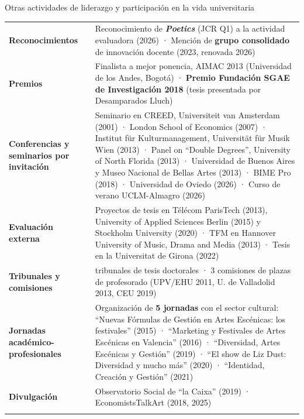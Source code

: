 \documentclass[
  8pt,
  ignorenonframetext,
  aspectratio=169,
  spanish,
]{beamer}
\newcommand{\lightrowrule}{\arrayrulecolor{black!25}\specialrule{0.4pt}{1pt}{1pt}\arrayrulecolor{black}}
\begin{document}
\begin{frame}[shrink]{Otras actividades de liderazgo y participación en
la vida universitaria}
\label{otras-actividades-de-liderazgo-y-participaciuxf3n-en-la-vida-universitaria}
~

\begin{longtable}[]{@{}
  >{\raggedright\arraybackslash}p{}
  >{\raggedright\arraybackslash}p{}@{}}
\toprule\noalign{}
\endhead
\bottomrule\noalign{}
\endlastfoot
\textbf{Reconocimientos} & Reconocimiento de \textbf{\emph{Poetics}}
(JCR Q1) a la actividad evaluadora (2026) · Mención de \textbf{grupo
consolidado} de innovación docente (2023, renovada 2026) \\ \lightrowrule
\textbf{Premios} & Finalista a mejor ponencia, AIMAC 2013 (Universidad
de los Andes, Bogotá) · \textbf{Premio Fundación SGAE de Investigación
2018} (tesis presentada por Desamparados Lluch) \\ \lightrowrule
\textbf{Conferencias y seminarios por invitación} & Seminario en CREED,
Universiteit van Amsterdam (2001) · London School of Economics (2007) ·
Institut für Kulturmanagement, Universität für Musik Wien (2013) · Panel
on ``Double Degrees'', University of North Florida (2013) · Universidad
de Buenos Aires y Museo Nacional de Bellas Artes (2013) · BIME Pro
(2018) · Universidad de Oviedo (2026) · Curso de verano UCLM-Almagro
(2026) \\ \lightrowrule
\textbf{Evaluación externa} & Proyectos de tesis en Télécom ParisTech
(2013), University of Applied Sciences Berlin (2015) y Stockholm
University (2020) · TFM en Hannover University of Music, Drama and Media
(2013) · Tesis en la Universitat de Girona (2022) \\ \lightrowrule
\textbf{Tribunales y comisiones} & 3 tribunales de tesis doctorales · 3
comisiones de plazas de profesorado (UPV/EHU 2011, U. de Valladolid
2013, CEU 2019) \\ \lightrowrule
\textbf{Jornadas académico-profesionales} & Organización de \textbf{5
jornadas} con el sector cultural: ``Nuevas Fórmulas de Gestión en Artes
Escénicas: los festivales'' (2015) · ``Marketing y Festivales de Artes
Escénicas en Valencia'' (2016) · ``Diversidad, Artes Escénicas y
Gestión'' (2019) · ``El show de Liz Dust: Diversidad y mucho más''
(2020) · ``Identidad, Creación y Gestión'' (2021) \\ \lightrowrule
\textbf{Divulgación} & Observatorio Social de ``la Caixa'' (2019) ·
EconomistsTalkArt (2018, 2025) \\ \lightrowrule
\end{longtable}


\end{frame}
\end{document}

